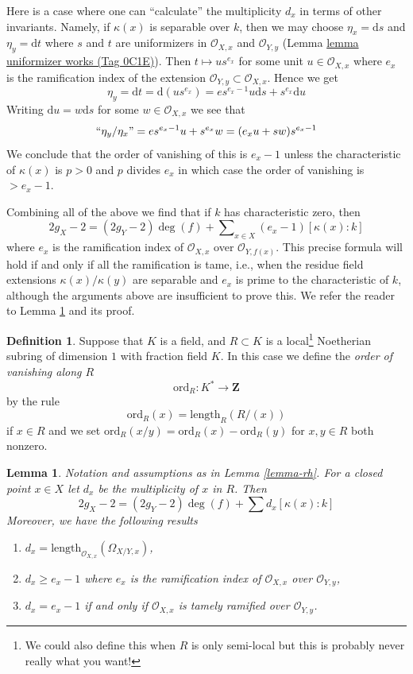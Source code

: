 \documentclass{amsart}
\theoremstyle{plain}
\newtheorem{lemma}[subsection]{Lemma}
\theoremstyle{definition}
\newtheorem{definition}[subsection]{Definition}
\theoremstyle{remark}
\numberwithin{equation}{subsection}
\begin{document}
\medskip\noindent
Here is a case where one can ``calculate'' the multiplicity $d_x$ in terms
of other invariants. Namely, if $\kappa(x)$ is separable over $k$, then
we may choose $\eta_x = \text{d}s$ and $\eta_y = \text{d}t$ where $s$
and $t$ are uniformizers in $\mathcal{O}_{X, x}$ and $\mathcal{O}_{Y, y}$
(Lemma \href{https://stacks.math.columbia.edu/tag/0C1E}{lemma uniformizer works (Tag 0C1E)}).
Then $t \mapsto u s^{e_x}$ for some unit $u \in \mathcal{O}_{X, x}$
where $e_x$ is the ramification index of the extension
$\mathcal{O}_{Y, y} \subset \mathcal{O}_{X, x}$. Hence we get
$$
\eta_y = \text{d}t = \text{d}(u s^{e_x}) =
e s^{e_x - 1} u \text{d}s + s^{e_x} \text{d}u
$$
Writing $\text{d}u = w \text{d}s$ for some $w \in \mathcal{O}_{X, x}$
we see that
$$
``\eta_y/\eta_x" = e s^{e_x - 1} u + s^{e_x} w = (e_x u + s w)s^{e_x - 1}
$$
We conclude that the order of vanishing of this is $e_x - 1$
unless the characteristic of $\kappa(x)$ is $p > 0$ and $p$ divides $e_x$
in which case the order of vanishing is $> e_x - 1$.

\medskip\noindent
Combining all of the above we find that if $k$ has characteristic
zero, then
$$
2g_X - 2 = (2g_Y - 2)\deg(f) +
\sum\nolimits_{x \in X} (e_x - 1)[\kappa(x) : k]
$$
where $e_x$ is the ramification index of $\mathcal{O}_{X, x}$ over
$\mathcal{O}_{Y, f(x)}$. This precise formula will hold if and only
if all the ramification is tame, i.e., when the
residue field extensions $\kappa(x)/\kappa(y)$ are separable and
$e_x$ is prime to the characteristic of $k$, although the
arguments above are insufficient to prove this. We refer the reader
to Lemma \ref{lemma-rhe} and its proof.



\begin{definition}
\label{algebra-definition-ord}
Suppose that $K$ is a field, and $R \subset K$ is a
local\footnote{We could also define this when $R$ is only
semi-local but this is probably never really what you want!}
Noetherian subring of dimension $1$ with fraction field $K$.
In this case we define the {\it order of vanishing along $R$}
$$
\text{ord}_R : K^* \longrightarrow \mathbf{Z}
$$
by the rule
$$
\text{ord}_R(x) = \text{length}_R(R/(x))
$$
if $x \in R$ and we set
$\text{ord}_R(x/y) = \text{ord}_R(x) - \text{ord}_R(y)$
for $x, y \in R$ both nonzero.
\end{definition}

\begin{lemma}
\label{lemma-rhe}
Notation and assumptions as in Lemma \ref{lemma-rh}. For a closed point
$x \in X$ let $d_x$ be the multiplicity of $x$ in $R$. Then
$$
2g_X - 2 = (2g_Y - 2) \deg(f) + \sum\nolimits d_x [\kappa(x) : k]
$$
Moreover, we have the following results
\begin{enumerate}
\item $d_x = \text{length}_{\mathcal{O}_{X, x}}(\Omega_{X/Y, x})$,
\item $d_x \geq e_x - 1$ where $e_x$ is the ramification index
of $\mathcal{O}_{X, x}$ over $\mathcal{O}_{Y, y}$,
\item $d_x = e_x - 1$ if and only if $\mathcal{O}_{X, x}$ is tamely
ramified over $\mathcal{O}_{Y, y}$.
\end{enumerate}
\end{lemma}
\end{document}
